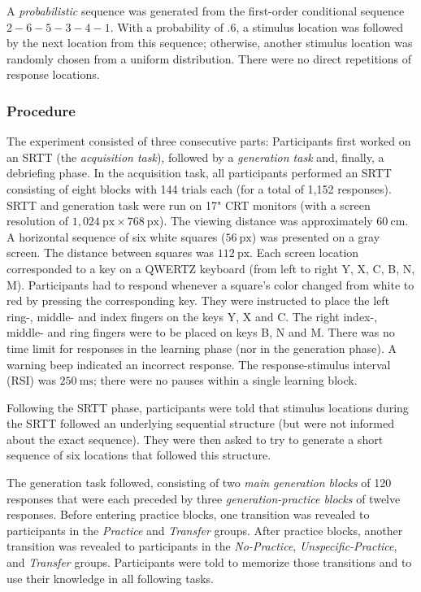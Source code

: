 \documentclass[floatsintext,doc]{apa6}
\theoremstyle{definition}
\theoremstyle{definition}
\theoremstyle{definition}
\theoremstyle{remark}
\begin{document}
A \emph{probabilistic} sequence was generated from the first-order
conditional sequence \(2-6-5-3-4-1\). With a probability of \(.6\), a
stimulus location was followed by the next location from this sequence;
otherwise, another stimulus location was randomly chosen from a uniform
distribution. There were no direct repetitions of response locations.

\subsubsection{Procedure}\label{procedure}

The experiment consisted of three consecutive parts: Participants first
worked on an SRTT (the \emph{acquisition task}), followed by a
\emph{generation task} and, finally, a debriefing phase. In the
acquisition task, all participants performed an SRTT consisting of eight
blocks with 144 trials each (for a total of 1,152 responses). SRTT and
generation task were run on 17" CRT monitors (with a screen resolution
of \(1{,}024~\text{px} \times 768~\text{px}\)). The viewing distance was
approximately \(60~\text{cm}\). A horizontal sequence of six white
squares (\(56~\text{px}\)) was presented on a gray screen. The distance
between squares was \(112~\text{px}\). Each screen location corresponded
to a key on a QWERTZ keyboard (from left to right Y, X, C, B, N, M).
Participants had to respond whenever a square's color changed from white
to red by pressing the corresponding key. They were instructed to place
the left ring-, middle- and index fingers on the keys Y, X and C. The
right index-, middle- and ring fingers were to be placed on keys B, N
and M. There was no time limit for responses in the learning phase (nor
in the generation phase). A warning beep indicated an incorrect
response. The response-stimulus interval (RSI) was \(250~\text{ms}\);
there were no pauses within a single learning block.

Following the SRTT phase, participants were told that stimulus locations
during the SRTT followed an underlying sequential structure (but were
not informed about the exact sequence). They were then asked to try to
generate a short sequence of six locations that followed this structure.

The generation task followed, consisting of two \emph{main generation
blocks} of 120 responses that were each preceded by three
\emph{generation-practice blocks} of twelve responses. Before entering
practice blocks, one transition was revealed to participants in the
\emph{Practice} and \emph{Transfer} groups. After practice blocks,
another transition was revealed to participants in the
\emph{No-Practice}, \emph{Unspecific-Practice}, and \emph{Transfer}
groups. Participants were told to memorize those transitions and to use
their knowledge in all following tasks.
\end{document}
